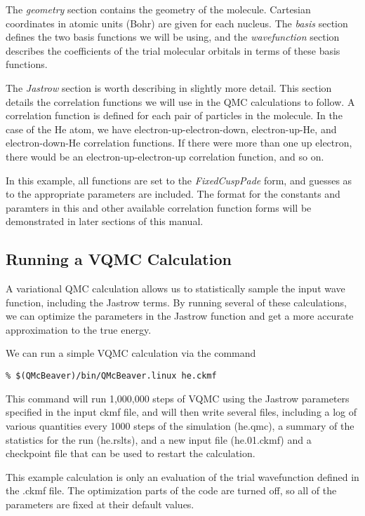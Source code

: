 \documentclass{article}
\begin{document}
The \emph{geometry} section contains the geometry of the molecule.
Cartesian coordinates in atomic units (Bohr) are given for each nucleus.
The \emph{basis} section defines the two basis functions we will be
using, and the \emph{wavefunction} section describes the coefficients
of the trial molecular orbitals in terms of these basis functions.

The \emph{Jastrow} section is worth describing in slightly more
detail. This section details the correlation functions we will use in
the QMC calculations to follow.  A correlation function is defined for
each pair of particles in the molecule.  In the case of the He atom,
we have electron-up-electron-down, electron-up-He, and
electron-down-He correlation functions.  If there were more than one
up electron, there would be an electron-up-electron-up correlation
function, and so on.   

In this example, all functions are set to the \emph{FixedCuspPade}
form, and guesses as to the appropriate parameters are included. 
The format for the constants and paramters in this and other available
correlation function forms will be demonstrated in later sections of
this manual.

\subsection{Running a VQMC Calculation}
A variational QMC calculation allows us to statistically sample the
input wave function, including the Jastrow terms. By running several
of these calculations, we can optimize the parameters in the Jastrow
function and get a more accurate approximation to the true energy.

We can run a simple VQMC calculation via the command
\begin{verbatim}
% $(QMcBeaver)/bin/QMcBeaver.linux he.ckmf
\end{verbatim}

This command will run 1,000,000 steps of VQMC using the Jastrow
parameters specified in the input ckmf file, and will then write
several files, including a log of various quantities every 1000 steps
of the simulation (he.qmc), a summary of the statistics for the run
(he.rslts), and a new input file (he.01.ckmf) and a checkpoint file
that can be used to restart the calculation.

This example calculation is only an evaluation of the trial
wavefunction defined in the .ckmf file.  The optimization parts of the
code are turned off, so all of the parameters are fixed at their
default values.  
\end{document}

